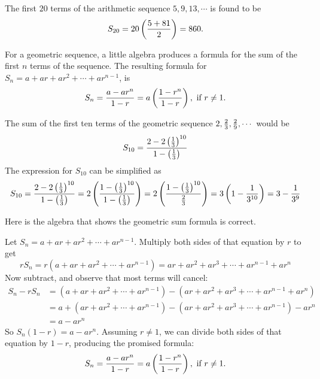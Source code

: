 \begin{exmp}
The first $20$ terms of the arithmetic sequence $5, 9, 13, \cdots$ is
found to be
\[
S_{20} = 20\left({5+ 81}\over2\right) = 860.
\]
\end{exmp}

 
For a geometric sequence,
 a little algebra  produces a formula for
the sum of the first $n$ terms of the sequence. 
The resulting formula for $S_{n} =
a+ar+ar^2+\cdots+ar^{n-1}$, is 
\[
S_{n} = {{a-ar^{n}}\over{1-r}}= a\left({{1-r^{n}}\over{1-r}}\right),
\text{ if $r\not=1$.}
\]

\begin{exmp} The sum of the first ten
terms of the geometric sequence $2,{2\over3},{2\over9},\cdots$
would be %
\[
S_{10}={{2-2\left(1\over3\right)^{10}}\over{1-\left(1\over3\right)}}
\]
 The expression for $S_{10}$ can be simplified as
\[
S_{10}={{2-2\left(1\over3\right)^{10}}\over{1-\left(1\over3\right)}}=2\left({{1-\left(1\over3\right)^{10}}\over{1-\left(1\over3\right)}}\right)=
2\left({{1-\left(1\over3\right)^{10}}\over{2\over3}}\right)=
3\left(1-{1\over{3^{10}}}\right)= 3-{1\over{3^9}}
\]
\end{exmp}


Here is the algebra that shows the geometric sum formula is correct.

Let $S_n = a+ar+ar^2+\cdots+ar^{n-1}$. Multiply both sides of that
equation by $r$ to get
\[
rS_n = r(a+ar+ar^2+\cdots+ar^{n-1}) = ar +ar^2+ar^3+\cdots +ar^{n-1}+ar^n
\]
Now subtract, and observe that most terms will cancel:
\begin{align*}
 S_n-rS_n & = (a+ar+ar^2+\cdots+ar^{n-1})-(ar +ar^2+ar^3+\cdots +ar^{n-1}+ar^n) \\
 &= a + (ar+ar^2+\cdots+ar^{n-1}) -(ar +ar^2+ar^3+\cdots +ar^{n-1})-ar^n \\
 &= a - ar^n
\end{align*}
So $S_n(1-r) = a-ar^n$. Assuming $r\not=1$, we can divide both sides of that
equation by $1-r$, producing the promised formula:
\begin{equation}\label{eqn:geom series formula}
S_n= {{a-ar^{n}}\over{1-r}}= a\left({{1-r^{n}}\over{1-r}}\right), \text{ if $r\not=1$.}
\end{equation}

\clearpage

